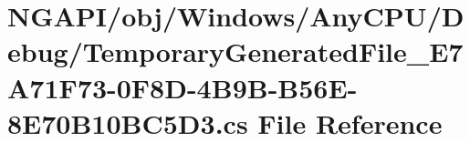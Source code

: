 \hypertarget{_n_g_a_p_i_2obj_2_windows_2_any_c_p_u_2_debug_2_temporary_generated_file___e7_a71_f73-0_f8_d-4_bd0a821cd158483c1ce779a09bcda2b7b}{}\section{N\+G\+A\+P\+I/obj/\+Windows/\+Any\+C\+P\+U/\+Debug/\+Temporary\+Generated\+File\+\_\+\+E7\+A71\+F73-\/0\+F8\+D-\/4\+B9\+B-\/\+B56\+E-\/8\+E70\+B10\+B\+C5\+D3.cs File Reference}
\label{_n_g_a_p_i_2obj_2_windows_2_any_c_p_u_2_debug_2_temporary_generated_file___e7_a71_f73-0_f8_d-4_bd0a821cd158483c1ce779a09bcda2b7b}
